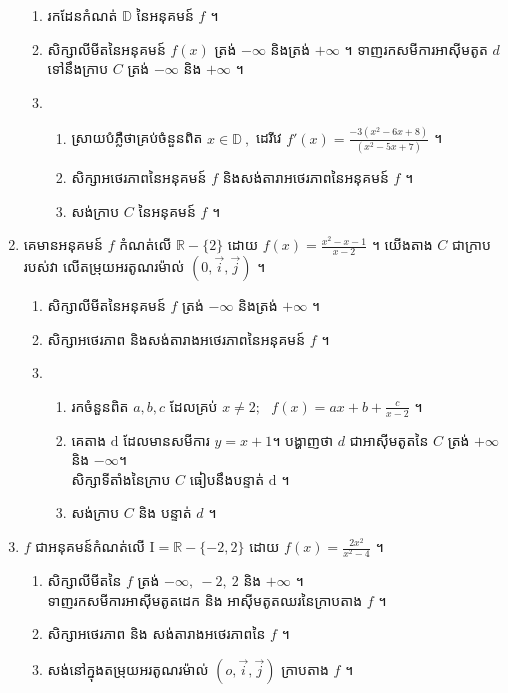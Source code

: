 \documentclass[12pt, a4paper]{article}
\begin{document}
\begin{enumerate}[m]
	\begin{enumerate}[1]
		\item រកដែនកំណត់ $\mathbb{D}$ នៃអនុគមន៍ $f$ ។
		\item សិក្សាលីមីតនៃអនុគមន៍ $f(x)$ ត្រង់ $-\infty$ និងត្រង់ $+\infty$ ។ ទាញរកសមីការអាស៊ីមតូត $d$ ទៅនឹងក្រាប $C$ ត្រង់ $-\infty$ និង $+\infty$ ។
		\item \begin{enumerate}[k]
			\item ស្រាយបំភ្លឺថាគ្រប់ចំនួនពិត $x\in\mathbb{D}~,$ ដេរីវេ $f'(x)=\frac{-3\left(x^2-6x+8\right)}{\left(x^2-5x+7\right)}$ ។
			\item សិក្សាអថេរភាពនៃអនុគមន៍ $f$ និងសង់តារាអថេរភាពនៃអនុគមន៍ $f$ ។
			\item សង់ក្រាប $C$ នៃអនុគមន៍ $f$ ។
		\end{enumerate}
	\end{enumerate}
	\item គេមានអនុគមន៍ $f$ កំណត់លើ $\mathbb{R}-\{2\}$ ដោយ $f(x)=\frac{x^2-x-1}{x-2}$ ។ យើងតាង $C$ ជាក្រាបរបស់វា លើតម្រុយអរតូណរម៉ាល់ $\left(0,\overrightarrow{i},\overrightarrow{j}\right)$ ។
	\begin{enumerate}[1]
		\item សិក្សាលីមីតនៃអនុគមន៍ $f$ ត្រង់ $-\infty$ និងត្រង់ $+\infty$ ។
		\item សិក្សាអថេរភាព និងសង់តារាងអថេរភាពនៃអនុគមន៍ $f$ ។
		\item \begin{enumerate}[k]
			\item រកចំនួនពិត $a,b,c$ ដែលគ្រប់ $x\neq 2;\ \ \ f(x)=ax+b+\frac{c}{x-2}$ ។
			\item គេតាង $\mathrm{d}$ ដែលមានសមីការ $y=x+1$។ បង្ហាញថា $d$ ជាអាស៊ីមតូតនៃ $C$ ត្រង់ $+\infty$ និង $-\infty$។ 
			\\ សិក្សាទីតាំងនៃក្រាប $C$ ធៀបនឹងបន្ទាត់ $\mathrm{d}$ ។
			\item សង់ក្រាប $C$ និង បន្ទាត់ $d$ ។
		\end{enumerate}
	\end{enumerate}
	\item $f$ ជាអនុគមន៍កំណត់លើ $\mathrm{I}=\mathbb{R}-\{-2,2\}$ ដោយ $f(x)=\frac{2x^2}{x^2-4}$ ។
	\begin{enumerate}[k]
		\item សិក្សាលីមីតនៃ $f$ ត្រង់ $-\infty,\ -2,\ 2 $ និង $+\infty$ ។\\ 
		ទាញរកសមីការអាស៊ីមតូតដេក និង អាស៊ីមតូតឈរនៃក្រាបតាង $f$ ។
		\item សិក្សាអថេរភាព និង សង់តារាងអថេរភាពនៃ $f$ ។
		\item សង់នៅក្នុងតម្រុយអរតូណរម៉ាល់ $\left(o,\overrightarrow{i},\overrightarrow{j}\right)$ ក្រាបតាង $f$ ។

\end{enumerate}
\end{enumerate}
\end{document}
